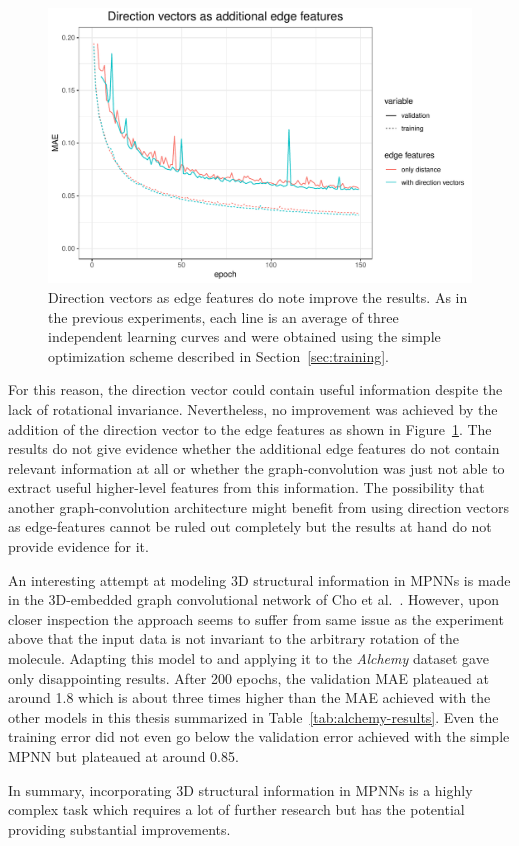 \begin{figure}[H]
	\includegraphics[width=\linewidth]{figures/edge-direction-vectors}
	\caption{Direction vectors as edge features do note improve the results. As in the previous experiments, each line is an average of three independent learning curves and were obtained using the simple optimization scheme described in Section~\ref{sec:training}.}
	\label{fig:edge-direction-vectors}
\end{figure}

For this reason, the direction vector could contain useful information despite the lack of rotational invariance. Nevertheless, no improvement was achieved by the addition of the direction vector to the edge features as shown in Figure~\ref{fig:edge-direction-vectors}. The results do not give evidence whether the additional edge features do not contain relevant information at all or whether the graph-convolution was just not able to extract useful higher-level features from this information. The possibility that another graph-convolution architecture might benefit from using direction vectors as edge-features cannot be ruled out completely but the results at hand do not provide evidence for it.

An interesting attempt at modeling 3D structural information in MPNNs is made in the 3D-embedded graph convolutional network of Cho et al.~\cite{Cho2018}. However, upon closer inspection the approach seems to suffer from same issue as the experiment above that the input data is not invariant to the arbitrary rotation of the molecule. Adapting this model to and applying it to the \textit{Alchemy} dataset gave only disappointing results. After 200 epochs, the validation MAE plateaued at around 1.8 which is about three times higher than the MAE achieved with the other models in this thesis summarized in Table~\ref{tab:alchemy-results}. Even the training error did not even go below the validation error achieved with the simple MPNN but plateaued at around 0.85.

In summary, incorporating 3D structural information in MPNNs is a highly complex task which requires a lot of further research but has the potential providing substantial improvements.







